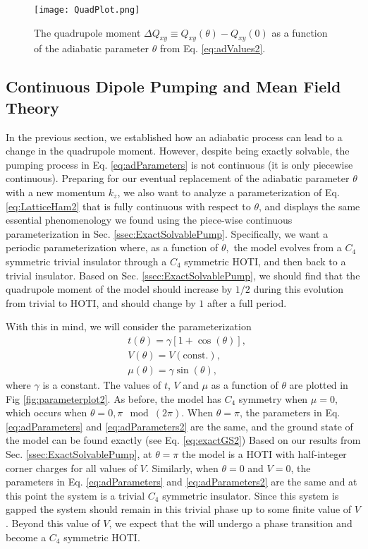 \documentclass[prb,aps,twocolumn,groupaddress,floatfix]{revtex4-1}
\begin{document}
\begin{figure}\centering
\texttt{[image: QuadPlot.png]}
\caption{The quadrupole moment $\Delta Q_{xy} \equiv Q_{xy}(\theta)-Q_{xy}(0)$ as a function of the adiabatic parameter $\theta $ from Eq. \ref{eq:adValues2}. }\label{fig:quadrupolePlot}
\end{figure}


\subsection{Continuous Dipole Pumping and Mean Field Theory}\label{ssec:ContDipolePumping}
In the previous section, we established how an adiabatic process can lead to a change in the quadrupole moment.  However, despite being exactly solvable, the pumping process in Eq. \ref{eq:adParameters} is not continuous (it is only piecewise continuous). Preparing for our eventual replacement of the adiabatic parameter $\theta$ with a new momentum $k_z$, we also want to analyze a parameterization of Eq. \ref{eq:LatticeHam2} that is fully continuous with respect to $\theta$, and displays the same essential phenomenology we found using the piece-wise continuous parameterization in Sec. \ref{ssec:ExactSolvablePump}. Specifically, we want a periodic parameterization where, as a function of $\theta,$ the model evolves from a $C_4$ symmetric trivial insulator through a $C_4$ symmetric HOTI, and then back to a trivial insulator. Based on Sec. \ref{ssec:ExactSolvablePump}, we should find that the quadrupole moment of the model should increase by $1/2$ during this evolution from trivial to HOTI, and should change by $1$ after a full period. 

With this in mind, we will consider the parameterization 
\begin{equation}
\begin{split}
&t(\theta ) = \gamma[1+\cos(\theta )],\\
&V(\theta ) = V(\text{const.}),\\
&\mu(\theta ) = \gamma\sin(\theta ),
\end{split}
\label{eq:adParameters2}
\end{equation}
where $\gamma$ is a constant. The values of $t$, $V$ and $\mu$ as a function of $\theta$ are plotted in Fig \ref{fig:parameterplot2}. As before, the model has $C_4$ symmetry when $\mu = 0$, which occurs when $\theta = 0,\pi \mod(2\pi)$. When $\theta = \pi$, the parameters in Eq. \ref{eq:adParameters} and \ref{eq:adParameters2} are the same, and the ground state of the model can be found exactly (see Eq. \ref{eq:exactGS2}) Based on our results from Sec. \ref{ssec:ExactSolvablePump}, at $\theta = \pi$ the model is a HOTI with half-integer corner charges for all values of $V$. Similarly, when $\theta = 0$ and $V=0$, the parameters in Eq. \ref{eq:adParameters} and \ref{eq:adParameters2} are the same and at this point the system is a trivial $C_4$ symmetric insulator. Since this system is gapped the system should remain in this trivial phase up to some finite value of $V$. Beyond this value of $V$, we expect that the will undergo a phase transition and become a $C_4$ symmetric HOTI.
\end{document}
